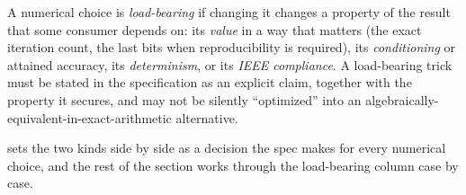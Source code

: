 \begin{definition}
\label{def:loadbearing}
A numerical choice is \emph{load-bearing} if changing it changes a property of the
result that some consumer depends on: its \emph{value} in a way that matters (the
exact iteration count, the last bits when reproducibility is required), its
\emph{conditioning} or attained accuracy, its \emph{determinism}, or its
\emph{IEEE compliance}. A load-bearing trick must be stated in the specification as
an explicit claim, together with the property it secures, and may not be silently
``optimized'' into an algebraically-equivalent-in-exact-arithmetic alternative.
\end{definition}

 sets the two kinds side by side as a decision the spec makes for
every numerical choice, and the rest of the section works through the load-bearing
column case by case.

